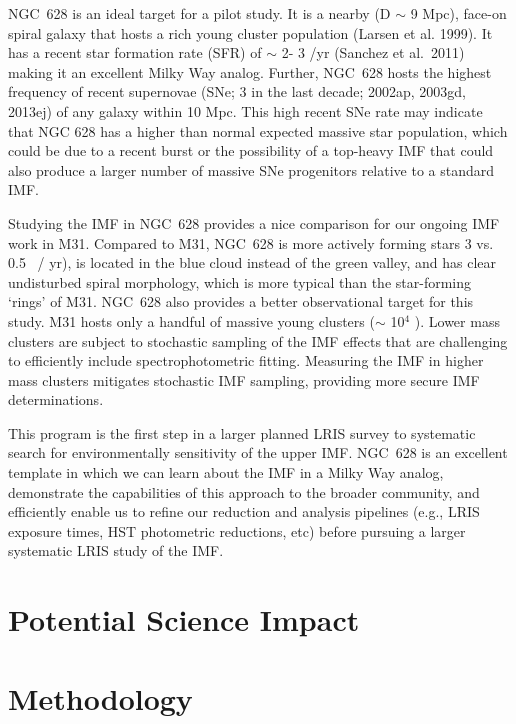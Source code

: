 \documentclass[11pt,preprint]{aastex}
\begin{document}
NGC~628 is an ideal target for a pilot study.  It is a nearby (D $\sim$ 9 Mpc), face-on spiral galaxy that hosts a rich young cluster population (Larsen et al. 1999). It has a recent star formation rate (SFR) of $\sim$ 2- 3 \msun /yr (Sanchez et al.\ 2011) making it an excellent Milky Way analog.  Further, NGC~628 hosts the highest frequency of recent supernovae (SNe; 3 in the last decade;  2002ap, 2003gd, 2013ej) of any galaxy within 10 Mpc.  This high recent SNe rate may indicate that NGC 628 has a higher than normal expected massive star population, which could be due to a recent burst or the possibility of a top-heavy IMF that could also produce a larger number of massive SNe progenitors relative to a standard IMF.

Studying the IMF in NGC~628 provides a nice comparison for our ongoing IMF work in M31.  Compared to M31, NGC~628 is more actively forming stars 3 vs. 0.5 \msun\ / yr), is located in the blue cloud instead of the green valley, and has clear undisturbed spiral morphology, which is more typical than the star-forming `rings' of M31.  NGC~628 also provides a better observational target for this study. M31 hosts only a handful of massive young clusters ($\sim$ 10$^4$ \msun).  Lower mass clusters are subject to stochastic sampling of the IMF effects that are challenging to efficiently include spectrophotometric fitting.  Measuring the IMF in higher mass clusters mitigates stochastic IMF sampling, providing more secure IMF determinations.

This program is the first step in a larger planned LRIS survey to systematic search for environmentally sensitivity of the upper IMF.  NGC~628 is an excellent template in which we can learn about the IMF in a Milky Way analog, demonstrate the capabilities of this approach to the broader community, and efficiently enable us to refine our reduction and analysis pipelines (e.g., LRIS exposure times, HST photometric reductions, etc) before pursuing a larger systematic LRIS study of the IMF.



\section{Potential Science Impact}



\section{Methodology}
\end{document}
